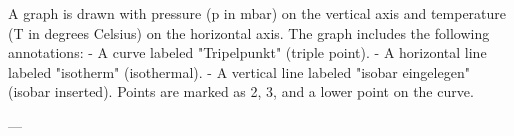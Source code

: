 A graph is drawn with pressure (p in mbar) on the vertical axis and temperature (T in degrees Celsius) on the horizontal axis. The graph includes the following annotations:  
- A curve labeled "Tripelpunkt" (triple point).  
- A horizontal line labeled "isotherm" (isothermal).  
- A vertical line labeled "isobar eingelegen" (isobar inserted).  
Points are marked as 2, 3, and a lower point on the curve.  

---